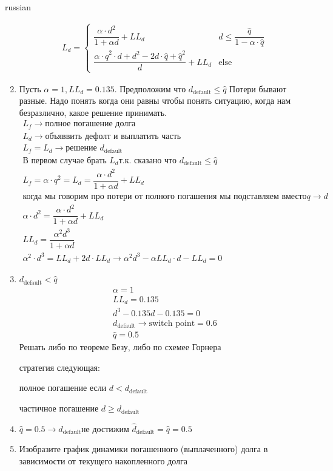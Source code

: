\documentclass{article}
\begin{document}
\begin{otherlanguage*}{russian}
\begin{enumerate}
\begin{align*}
L_d = \begin{cases}
\dfrac{\alpha \cdot d ^2}{1 + \alpha d } + LL_d & d \le \dfrac{\hat q }{1 - \alpha \cdot \hat q } \\
\dfrac{\alpha \cdot \hat q ^2 \cdot d + d ^ 2 - 2 d \cdot \hat q + \hat q ^ 2 }{d}  + LL_d  & \text{else} 
\end{cases}
\end{align*}
\item Пусть $ \alpha = 1, LL_d = 0.135 $. Предположим что $ d_{\text{default}} \le \hat q $ 
Потери бывают разные. Надо понять когда они равны чтобы понять ситуацию, когда нам безразлично, какое решение принимать. 
\begin{align*}
L_f \rightarrow \text{полное погашение долга} \\
L_d \rightarrow \text{объяввить дефолт и выплатить часть}  \\
L_f = L_d \rightarrow \text{решение } d_{\text{default }} \\
\text{В первом случае брать } L_d \text{т.к. сказано что } d_{\text{default}} \le \hat q \\
L_f = \alpha \cdot q ^2 = L_d = \dfrac{\alpha \cdot d ^2}{1 + \alpha d} + LL_ d \\
\text{когда мы говорим про потери от полного погашения мы подставляем вместо} q \rightarrow d \\
\alpha \cdot d ^ 2 = \dfrac{\alpha \cdot d ^2}{1 + \alpha d} + LL_d \\
LL_d = \dfrac{\alpha ^2 d ^ 3}{1 + \alpha d} \\
\alpha ^ 2 \cdot d ^ 3 = LL_d + 2 d \cdot LL_d \rightarrow \alpha ^ 2 d ^3 - \alpha LL_d \cdot d - LL_d = 0 
\end{align*}
\item $ d_{\text{default}} < \hat q $ 
\begin{align*}
\alpha = 1 \\
LL_d = 0.135 \\ 
d ^ 3 - 0.135 d - 0.135 = 0 \\
d_{\text{default}} \rightarrow \text{switch point} = 0.6 \\
\hat q = 0.5 
\end{align*}
Решать либо по теореме Безу, либо по схемее Горнера

стратегия следующая: 

полное погашение если $ d < d_{\text{default}} $

частичное погашение $ d \ge d_{\text{default}} $ 
\item $ \hat q = 0.5 \rightarrow d_{\text{default}} \text{не достижим} $ 
$ \hat d_{\text{default}} = \hat q = 0.5 $
\item Изобразите график динамики погашенного (выплаченного) долга в зависимости от текущего накопленного долга


\end{enumerate}
\end{otherlanguage*}
\end{document}
